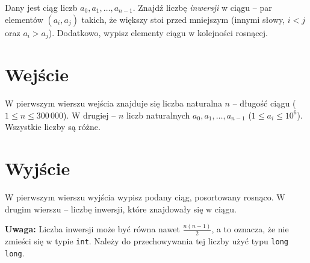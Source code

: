 \documentclass{spiral-kurs}
\begin{document}
\makeheader
%
  
  Dany jest ciąg liczb $a_0, a_1, \ldots, a_{n-1}$. Znajdź liczbę \emph{inwersji} w ciągu -- par elementów $(a_i, a_j)$ takich, że większy stoi przed mniejszym (innymi słowy, $i < j$ oraz $a_i > a_j$). 
  Dodatkowo, wypisz elementy ciągu w kolejności rosnącej.

    \section{Wejście}
    W pierwszym wierszu wejścia znajduje się liczba naturalna $n$ -- długość ciągu ($1 \leq n \leq 300 \, 000$). W drugiej -- $n$ liczb
naturalnych $a_0, a_1, \ldots ,a_{n-1}$ ($1 \leq a_i \leq 10^6$). Wszystkie liczby są różne.
      
    \section{Wyjście}
    W pierwszym wierszu wyjścia wypisz podany ciąg, posortowany rosnąco. W drugim wierszu -- liczbę inwersji, które znajdowały się w ciągu.
    
    {\bf Uwaga:} Liczba inwersji może być równa nawet $\frac{n(n-1)}{2}$, a to oznacza, że nie zmieści się w typie {\tt int}. Należy do przechowywania tej liczby
    użyć typu {\tt long long}.

  
\end{document}
